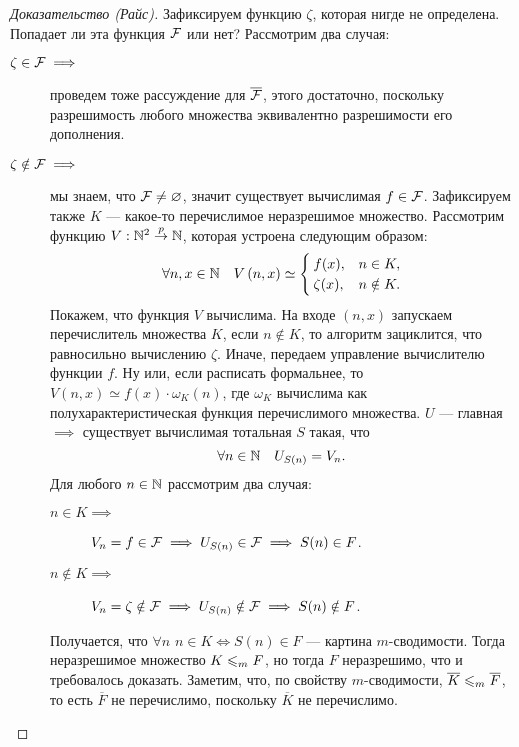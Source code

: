 \begin{proof}[Доказательство (Райс)]
    Зафиксируем функцию $\zeta$, которая нигде не определена.
    Попадает ли эта функция $\mathcal{F}$ или нет?
    Рассмотрим два случая:
    \begin{description}
        \item[$\zeta \in \mathcal{F} \implies$] проведем тоже рассуждение для $\overline{\mathcal{F}}$, этого достаточно, поскольку разрешимость любого множества эквивалентно разрешимости его дополнения.
        \item[$\zeta \notin \mathcal{F} \implies$] мы знаем, что $\mathcal{F} \neq \varnothing$, значит существует вычислимая $f \in \mathcal{F}$.
        Зафиксируем также $K$ --- какое-то перечислимое неразрешимое множество.
        Рассмотрим функцию $V: \mathbb{N}^{2} \overset{p}{\to} \mathbb{N}$, которая устроена следующим образом:
        $$
            \forall n, x \in \mathbb{N} \quad V\left(n, x\right) \simeq \begin{cases}
                f(x), & n \in K, \\
                \zeta(x), & n \notin K.
            \end{cases}
        $$
        Покажем, что функция $V$ вычислима.
        На входе $(n, x)$ запускаем перечислитель множества $K$, если $n \notin K$, то алгоритм зациклится, что равносильно вычислению $\zeta$.
        Иначе, передаем управление вычислителю функции $f$.
        Ну или, если расписать формальнее, то $V\left(n, x\right) \simeq f\left(x\right) \cdot \omega_{K}(n)$, где $\omega_{K}$ вычислима как полухарактеристическая функция перечислимого множества.
        $U$ --- главная $\implies$ существует вычислимая тотальная $S$ такая, что
        $$
            \forall n \in \mathbb{N} \quad U_{S(n)} = V_{n}.
        $$
        Для любого $n \in \mathbb{N}$ рассмотрим два случая:
        \begin{description}
            \item[$n \in K \implies$] $V_{n} = f \in \mathcal{F} \implies U_{S(n)} \in \mathcal{F} \implies S(n) \in F$.
            \item[$n \notin K \implies$] $V_{n} = \zeta \notin \mathcal{F} \implies U_{S(n)} \notin \mathcal{F} \implies S(n) \notin F$.
        \end{description}
        Получается, что $\forall n$ $n \in K \iff S(n) \in F$ --- картина $m$-сводимости.
        Тогда неразрешимое множество $K \leqslant_{m} F$, но тогда $F$ неразрешимо, что и требовалось доказать.
        Заметим, что, по свойству $m$-сводимости, $\overline{K} \leqslant_{m} \overline{F}$, то есть $\overline{F}$ не перечислимо, поскольку $\overline{K}$ не перечислимо.
    \end{description}
\end{proof}
